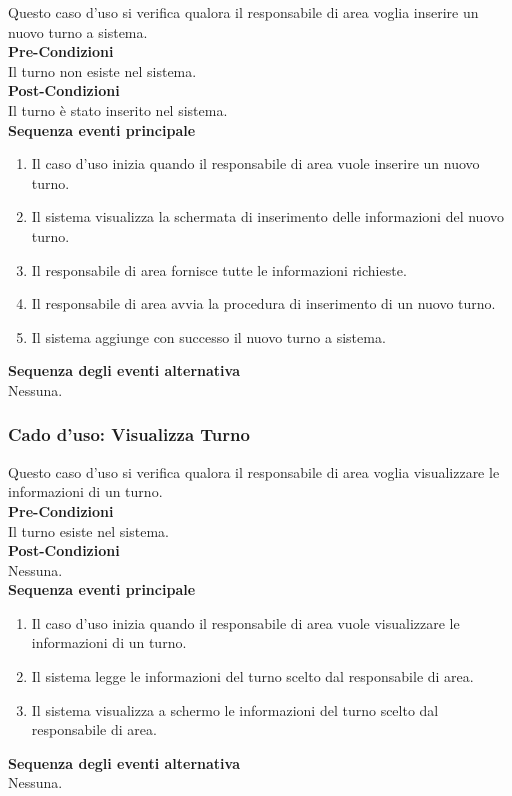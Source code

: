 \documentclass[green, fancy, 11pt]{elegantbook}
\begin{document}
Questo caso d’uso si verifica qualora il responsabile di area voglia inserire un nuovo turno a sistema.\\
\textbf{Pre-Condizioni}\\
Il turno non esiste nel sistema.\\
\textbf{Post-Condizioni}\\
Il turno è stato inserito nel sistema.\\
\textbf{Sequenza eventi principale}
\begin{enumerate}
	\item Il caso d’uso inizia quando il responsabile di area vuole inserire un nuovo turno.
    \item Il sistema visualizza la schermata di inserimento delle informazioni del nuovo turno.
	\item Il responsabile di area fornisce tutte le informazioni richieste.
	\item Il responsabile di area avvia la procedura di inserimento di un nuovo turno.
	\item Il sistema aggiunge con successo il nuovo turno a sistema.
\end{enumerate}
\textbf{Sequenza degli eventi alternativa}\\
Nessuna.
\newpage

\subsubsection{Cado d'uso: Visualizza Turno}

Questo caso d’uso si verifica qualora il responsabile di area voglia visualizzare le informazioni di un turno.\\
\textbf{Pre-Condizioni}\\
Il turno esiste nel sistema.\\
\textbf{Post-Condizioni}\\
Nessuna.\\
\textbf{Sequenza eventi principale}
\begin{enumerate}
	\item Il caso d’uso inizia quando il responsabile di area vuole visualizzare le informazioni di un turno.
	\item Il sistema legge le informazioni del turno scelto dal responsabile di area.
	\item Il sistema visualizza a schermo le informazioni del turno scelto dal responsabile di area.
\end{enumerate}
\textbf{Sequenza degli eventi alternativa}\\
Nessuna.
\end{document}
